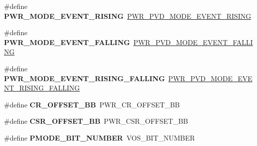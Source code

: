 \begin{DoxyCompactItemize}
\item 
\mbox{\label{group___h_a_l___p_w_r___aliased_gaca42d0e80c82d3f35ec7b07227fb8b7f}} 
\#define {\bfseries P\+W\+R\+\_\+\+M\+O\+D\+E\+\_\+\+E\+V\+E\+N\+T\+\_\+\+R\+I\+S\+I\+NG}~\mbox{\hyperlink{group___p_w_r___p_v_d___mode_ga1a946b01887aa886de329a92c3ab0dd4}{P\+W\+R\+\_\+\+P\+V\+D\+\_\+\+M\+O\+D\+E\+\_\+\+E\+V\+E\+N\+T\+\_\+\+R\+I\+S\+I\+NG}}
\item 
\mbox{\label{group___h_a_l___p_w_r___aliased_gaa37ffde31fc0bdadb0ed77a9588034dd}} 
\#define {\bfseries P\+W\+R\+\_\+\+M\+O\+D\+E\+\_\+\+E\+V\+E\+N\+T\+\_\+\+F\+A\+L\+L\+I\+NG}~\mbox{\hyperlink{group___p_w_r___p_v_d___mode_gaaedbe45f1a1ea6c30af6ac51abae0cae}{P\+W\+R\+\_\+\+P\+V\+D\+\_\+\+M\+O\+D\+E\+\_\+\+E\+V\+E\+N\+T\+\_\+\+F\+A\+L\+L\+I\+NG}}
\item 
\mbox{\label{group___h_a_l___p_w_r___aliased_ga87c794b332bd1b39496a35613344a4cc}} 
\#define {\bfseries P\+W\+R\+\_\+\+M\+O\+D\+E\+\_\+\+E\+V\+E\+N\+T\+\_\+\+R\+I\+S\+I\+N\+G\+\_\+\+F\+A\+L\+L\+I\+NG}~\mbox{\hyperlink{group___p_w_r___p_v_d___mode_ga7455387c8e9049f9f66b46423d4f4091}{P\+W\+R\+\_\+\+P\+V\+D\+\_\+\+M\+O\+D\+E\+\_\+\+E\+V\+E\+N\+T\+\_\+\+R\+I\+S\+I\+N\+G\+\_\+\+F\+A\+L\+L\+I\+NG}}
\item 
\mbox{\label{group___h_a_l___p_w_r___aliased_ga8f5087b1948b370918ecbdf8eb614543}} 
\#define {\bfseries C\+R\+\_\+\+O\+F\+F\+S\+E\+T\+\_\+\+BB}~P\+W\+R\+\_\+\+C\+R\+\_\+\+O\+F\+F\+S\+E\+T\+\_\+\+BB
\item 
\mbox{\label{group___h_a_l___p_w_r___aliased_gaed8fdacbc906bcba6acfa26ffbfc1305}} 
\#define {\bfseries C\+S\+R\+\_\+\+O\+F\+F\+S\+E\+T\+\_\+\+BB}~P\+W\+R\+\_\+\+C\+S\+R\+\_\+\+O\+F\+F\+S\+E\+T\+\_\+\+BB
\item 
\mbox{\label{group___h_a_l___p_w_r___aliased_gadcd5e2748a515ef914b84737e10ab061}} 
\#define {\bfseries P\+M\+O\+D\+E\+\_\+\+B\+I\+T\+\_\+\+N\+U\+M\+B\+ER}~V\+O\+S\+\_\+\+B\+I\+T\+\_\+\+N\+U\+M\+B\+ER
\item 
\mbox{\label{group___h_a_l___p_w_r___aliased_ga2e7c040f5c63f0fce3e274d9a03f1d1a}} 

\end{DoxyCompactItemize}
